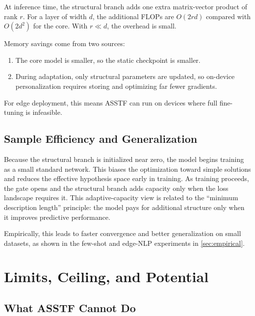 \documentclass[11pt,a4paper]{article}
\theoremstyle{definition}
\begin{document}
At inference time, the structural branch adds one extra matrix-vector product of rank $r$. For a layer of width $d$, the additional FLOPs are $O(2 r d)$ compared with $O(2 d^2)$ for the core. With $r \ll d$, the overhead is small.

Memory savings come from two sources:
\begin{enumerate}
    \item The core model is smaller, so the static checkpoint is smaller.
    \item During adaptation, only structural parameters are updated, so on-device personalization requires storing and optimizing far fewer gradients.
\end{enumerate}

For edge deployment, this means ASSTF can run on devices where full fine-tuning is infeasible.

\subsection{Sample Efficiency and Generalization}
\label{subsec:sample_eff}

Because the structural branch is initialized near zero, the model begins training as a small standard network. This biases the optimization toward simple solutions and reduces the effective hypothesis space early in training. As training proceeds, the gate opens and the structural branch adds capacity only when the loss landscape requires it. This adaptive-capacity view is related to the ``minimum description length'' principle: the model pays for additional structure only when it improves predictive performance.

Empirically, this leads to faster convergence and better generalization on small datasets, as shown in the few-shot and edge-NLP experiments in \cref{sec:empirical}.

\section{Limits, Ceiling, and Potential}
\label{sec:limits}

\subsection{What ASSTF Cannot Do}
\label{subsec:cannot}
\end{document}
